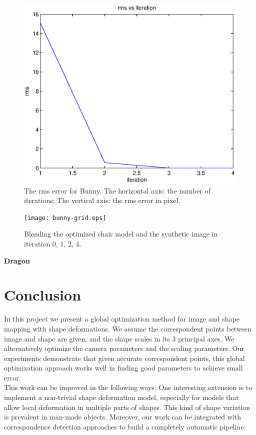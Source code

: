 \documentclass[10pt,twocolumn,letterpaper]{article}
\begin{document}
\begin{figure}[t]
\begin{center}
	\includegraphics[scale=0.55]{bunny-figure.eps}
\end{center}
	\caption{The rms error for Bunny. The horizontal axis: the number of iterations; The vertical axis: the rms error in pixel.}
\label{fig:bunnyplot}
\end{figure}

\begin{figure}
\begin{center}
	\texttt{[image: bunny-grid.eps]}
\end{center}
   \caption{Blending the optimized chair model and the synthetic image in iteration 0, 1, 2, 4.}
\label{fig:bunnygrid}
\end{figure}

\noindent
\textbf{Dragon}

\section{Conclusion}

\noindent
In this project we present a global optimization method for image and shape mapping with shape deformations. We assume the correspondent points between image and shape are given, and the shape scales in its 3 principal axes. We alternatively optimize the camera parameters and the scaling parameters. Our experiments demonstrate that given accurate correspondent points, this global optimization approach works well in finding good parameters to achieve small error.\\

\noindent
This work can be improved in the following ways: One interesting extension is to implement a non-trivial shape deformation model, especially for models that allow local deformation in multiple parts of shapes. This kind of shape variation is prevalent in man-made objects. Moreover, our work can be integrated with correspondence detection approaches to build a completely automatic pipeline.

{\small


}
\end{document}
